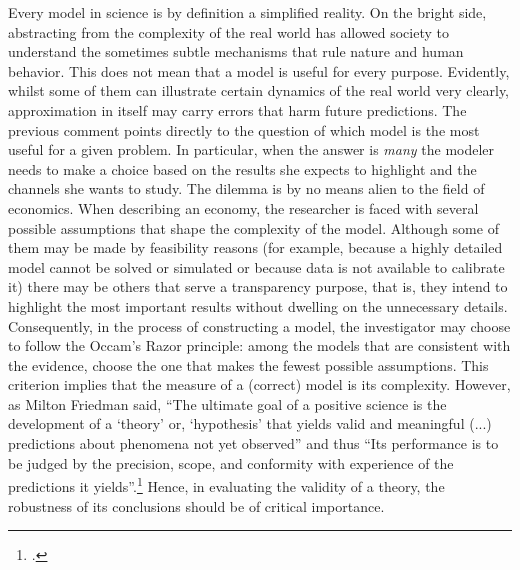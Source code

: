 \documentclass[english, a4paper,12pt]{article}
\begin{document}
Every model in science is by definition a simplified reality. On the bright side, abstracting from the complexity of the real world has allowed society to understand the sometimes subtle mechanisms that rule nature and human behavior. This does not mean that a model is useful for every purpose. Evidently, whilst some of them can illustrate certain dynamics of the real world very clearly, approximation in itself may carry errors that harm future predictions. The previous comment points directly to the question of which model is the most useful for a given problem. In particular, when the answer is \textit{many} the modeler needs to make a choice based on the results she expects to highlight and the channels she wants to study. The dilemma is by no means alien to the field of economics. When describing an economy, the researcher is faced with several possible assumptions that shape the complexity of the model. Although some of them may be made by feasibility reasons (for example, because a highly detailed model cannot be solved or simulated or because data is not available to calibrate it) there may be others that serve a transparency purpose, that is, they intend to highlight the most important results without dwelling on the unnecessary details. Consequently, in the process of constructing a model, the investigator may choose to follow the Occam's Razor principle: among the models that are consistent with the evidence, choose the one that makes the fewest possible assumptions. This criterion implies that the measure of a (correct) model is its complexity. However, as Milton Friedman said, ``The ultimate goal of a positive science is the development of a `theory' or, `hypothesis' that yields valid and meaningful (...) predictions about phenomena not yet observed'' and thus ``Its performance is to be judged by the precision, scope, and conformity with experience of the predictions it yields''.\footnote{\cite{FriedmanPositive}.} Hence, in evaluating the validity of a theory, the robustness of its conclusions should be of critical importance.
\end{document}
